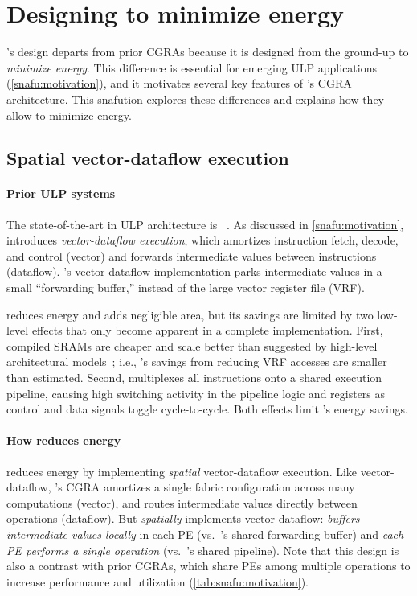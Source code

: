 \section{Designing \snafuframe to minimize energy}
\label{snafu:energy}

\snafuframe's design departs from prior CGRAs because it is designed from the ground-up to \emph{minimize energy}.
This difference is essential for emerging ULP applications (\autoref{snafu:motivation}),
and it motivates several key features of \snafuframe's CGRA architecture.
%
This snafution explores these differences and explains how they allow \snafuframe to minimize energy.

\subsection{Spatial vector-dataflow execution}

\paragraph{Prior ULP systems}
The state-of-the-art in ULP architecture is \manic~\cite{manic}.
%
As discussed in \autoref{snafu:motivation},
\manic introduces \emph{vector-dataflow execution},
which amortizes instruction fetch, decode, and control (vector)
and forwards intermediate values between instructions (dataflow).
\manic's vector-dataflow implementation parks intermediate values in a small ``forwarding buffer,'' instead of the large vector register file (VRF).

\manic reduces energy and adds negligible area,
but its savings are limited by two low-level effects that only become apparent in a complete implementation.
First, compiled SRAMs are cheaper and scale better than
suggested by high-level architectural models~\cite{cacti,destiny};
i.e., \manic's savings from reducing VRF accesses are smaller than estimated.
Second, \manic multiplexes all instructions onto a shared execution pipeline,
causing high switching activity in the pipeline logic and registers as control and data signals toggle cycle-to-cycle.
Both effects limit \manic's energy savings.

\paragraph{How \snafu reduces energy}
%
\snafuframe reduces energy by implementing \emph{spatial} vector-dataflow
execution.
%
Like vector-dataflow,
\snafuframe's CGRA amortizes a single fabric configuration across many computations (vector),
and routes intermediate values directly between operations (dataflow).
%
But \snafuframe \emph{spatially} implements vector-dataflow:
\snafuframe \emph{buffers intermediate values locally} in each PE (vs.\ \manic's shared forwarding buffer)
and \emph{each PE performs a single operation} (vs.\ \manic's shared pipeline).
%
Note that this design is also a contrast with prior CGRAs, which share PEs among
multiple operations to increase performance and utilization (\autoref{tab:snafu:motivation}).

